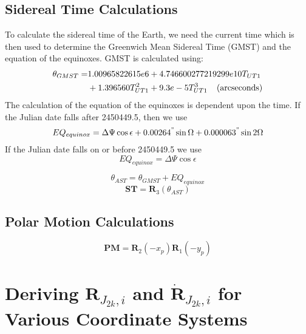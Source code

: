 {\subsection{Sidereal Time Calculations} 

To calculate the sidereal time of the Earth, we need the current
time which is then used to determine the Greenwich Mean Sidereal
Time (GMST) and the equation of the equinoxes.  GMST is calculated
using:
%
\begin{equation}
     \begin{split}
        \theta_{GMST} =  & 1.00965822615e6 + 4.746600277219299e10T_{UT1}\\ & + 1.396560T_{UT1}^2 +
        9.3e-5T_{UT1}^3  \hspace{.15 in} \mbox{(arcseconds)}
     \end{split}
\end{equation}
%
The calculation of the equation of the equinoxes is dependent upon
the time. If the Julian date falls after 2450449.5, then we use
%
\begin{equation}
   EQ_{equinox} = \Delta \Psi \cos{\epsilon} +
   0.00264^{"}\sin{\Omega} + 0.000063^{"}\sin{2\Omega}
\end{equation}
%
If the Julian date falls on or before 2450449.5 we use
\begin{equation}
   EQ_{equinox} = \Delta \Psi \cos{\epsilon}
\end{equation}

%
\begin{equation}
   \theta_{AST} = \theta_{GMST} + EQ_{equinox}
\end{equation}
%
\begin{equation}
   \mathbf{ST} = \mathbf{R}_3(\theta_{AST} )
\end{equation}

\subsection{Polar Motion Calculations} 

\begin{equation}
     \mathbf{PM} = \mathbf{R}_2 (-x_p) \mathbf{R}_1(-y_p)
\end{equation}


\section{ Deriving $\mathbf{R}_{J_{2k},i}$ and $\dot{\mathbf{R}}_{J_{2k},i}$ for Various
Coordinate Systems }

}
